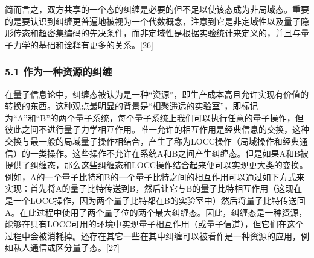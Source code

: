 简而言之，双方共享的一个态的纠缠是必要的但不足以使该态成为非局域态。重要的是要认识到纠缠更普遍地被视为一个代数概念，注意到它是非定域性以及量子隐形传态和超密集编码的先决条件，而非定域性是根据实验统计来定义的，并且与量子力学的基础和诠释有更多的关系。[26]

\subsubsection{5.1 作为一种资源的纠缠}
在量子信息论中，纠缠态被认为是一种“资源”，即生产成本高且允许实现有价值的转换的东西。这种观点最明显的背景是“相聚遥远的实验室”，即标记为“A”和“B”的两个量子系统，每个量子系统上我们可以执行任意的量子操作，但彼此之间不进行量子力学相互作用。唯一允许的相互作用是经典信息的交换，这种交换与最一般的局域量子操作相结合，产生了称为LOCC操作（局域操作和经典通信）的一类操作。这些操作不允许在系统A和B之间产生纠缠态。但是如果A和B被提供了纠缠态，那么这些纠缠态和LOCC操作结合起来便可以实现更大类的变换。例如，A的一个量子比特和B的一个量子比特之间的相互作用可以通过如下方式来实现：首先将A的量子比特传送到B，然后让它与B的量子比特相互作用（这现在是一个LOCC操作，因为两个量子比特都在B的实验室中）然后将量子比特传送回A。在此过程中使用了两个量子位的两个最大纠缠态。因此，纠缠态是一种资源，能够在只有LOCC可用的环境中实现量子相互作用（或量子信道），但它们在这个过程中会被消耗掉。还存在其它一些在其中纠缠可以被看作是一种资源的应用，例如私人通信或区分量子态。[27]

